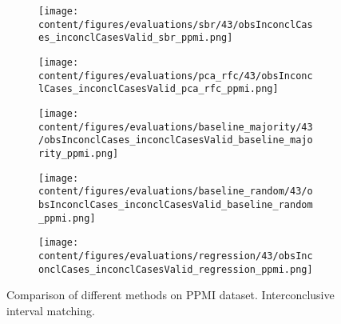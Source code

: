 \begin{figure}[t]
  \begin{subfigure}{0.5\textwidth}
    \centering
    \texttt{[image: content/figures/evaluations/sbr/43/obsInconclCases\_inconclCasesValid\_sbr\_ppmi.png]}
  \end{subfigure}
  \hfill
  \begin{subfigure}{0.5\textwidth}
    \centering
    \texttt{[image: content/figures/evaluations/pca\_rfc/43/obsInconclCases\_inconclCasesValid\_pca\_rfc\_ppmi.png]}
  \end{subfigure}
  \hfill
  \begin{subfigure}{0.5\textwidth}
    \centering
    \texttt{[image: content/figures/evaluations/baseline\_majority/43/obsInconclCases\_inconclCasesValid\_baseline\_majority\_ppmi.png]}
  \end{subfigure}
  \hfill
  \begin{subfigure}{0.5\textwidth}
    \centering
    \texttt{[image: content/figures/evaluations/baseline\_random/43/obsInconclCases\_inconclCasesValid\_baseline\_random\_ppmi.png]}
  \end{subfigure}
  \hfill
  \begin{subfigure}{0.5\textwidth}
    \centering
    \texttt{[image: content/figures/evaluations/regression/43/obsInconclCases\_inconclCasesValid\_regression\_ppmi.png]}
  \end{subfigure}

  \caption{Comparison of different methods on PPMI dataset. Interconclusive interval matching.}
  \label{fig:test_interval_match_ppmi}
\end{figure}


